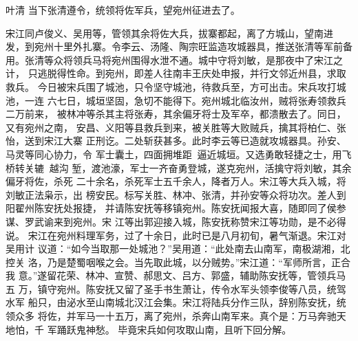 叶清
当下张清遵令，统领将佐军兵，望宛州征进去了。

宋江同卢俊义、吴用等，管领其余将佐大兵，拔寨都起，离了方城山，望南进
发，到宛州十里外扎寨。令李云、汤隆、陶宗旺监造攻城器具，推送张清等军前备
用。张清等众将领兵马将宛州围得水泄不通。城中守将刘敏，是那夜中了宋江之计，
只逃脱得性命。到宛州，即差人往南丰王庆处申报，并行文邻近州县，求取救兵。
今日被宋兵围了城池，只令坚守城池，待救兵至，方可出击。宋兵攻打城池，一连
六七日，城垣坚固，急切不能得下。宛州城北临汝州，贼将张寿领救兵二万前来，
被林冲等杀其主将张寿，其余偏牙将士及军卒，都溃散去了。同日，又有宛州之南，
安昌、义阳等县救兵到来，被关胜等大败贼兵，擒其将柏仁、张怡，送到宋江大寨
正刑讫。二处斩获甚多。此时李云等已造就攻城器具。孙安、马灵等同心协力，令
军士囊土，四面拥堆距，逼近城垣。又选勇敢轻捷之士，用飞桥转关辘，越沟
堑，渡池濠，军士一齐奋勇登城，遂克宛州，活擒守将刘敏，其余偏牙将佐，杀死
二十余名，杀死军士五千余人，降者万人。宋江等大兵入城，将刘敏正法枭示，出
榜安民。标写关胜、林冲、张清，并孙安等众将功次。差人到阳翟州陈安抚处报捷，
并请陈安抚等移镇宛州。陈安抚闻报大喜，随即同了侯参谋、罗武谕来到宛州。宋
江等出郭迎接入城，陈安抚称赞宋江等功勋，是不必得说。
宋江在宛州料理军务，过了十余日，此时已是八月初旬，暑气渐退。宋江对吴用计
议道：“如今当取那一处城池？”吴用道：“此处南去山南军，南极湖湘，北控关
洛，乃是楚蜀咽喉之会。当先取此城，以分贼势。”宋江道：“军师所言，正合我
意。”遂留花荣、林冲、宣赞、郝思文、吕方、郭盛，辅助陈安抚等，管领兵马五
万，镇守宛州。陈安抚又留了圣手书生萧让，传令水军头领李俊等八员，统驾水军
船只，由泌水至山南城北汉江会集。宋江将陆兵分作三队，辞别陈安抚，统领众多
将佐，并军马一十五万，离了宛州，杀奔山南军来。真个是：万马奔驰天地怕，千
军踊跃鬼神愁。
毕竟宋兵如何攻取山南，且听下回分解。
